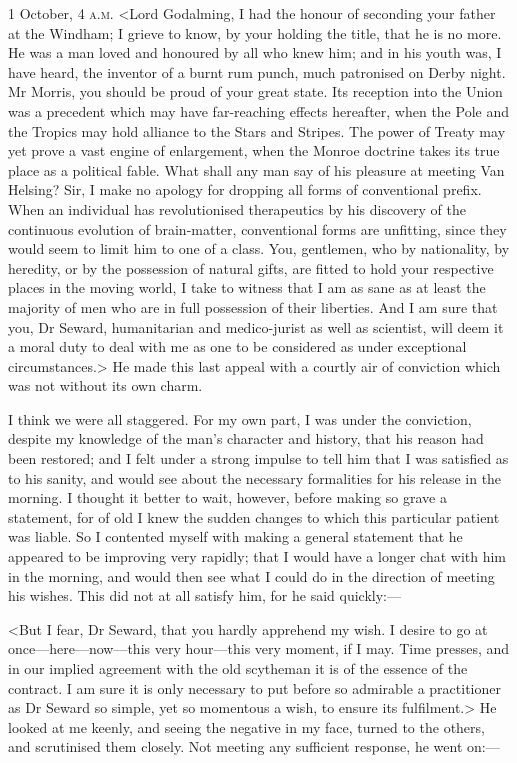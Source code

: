 \begin{diary}{1 October, 4 \textsc{a.m.}}
<Lord Godalming, I had the honour of seconding your father at the Windham; I grieve to know, by your holding the title, that he is no more. He was a man loved and honoured by all who knew him; and in his youth was, I have heard, the inventor of a burnt rum punch, much patronised on Derby night. Mr Morris, you should be proud of your great state. Its reception into the Union was a precedent which may have far-reaching effects hereafter, when the Pole and the Tropics may hold alliance to the Stars and Stripes. The power of Treaty may yet prove a vast engine of enlargement, when the Monroe doctrine takes its true place as a political fable. What shall any man say of his pleasure at meeting Van Helsing? Sir, I make no apology for dropping all forms of conventional prefix. When an individual has revolutionised therapeutics by his discovery of the continuous evolution of brain-matter, conventional forms are unfitting, since they would seem to limit him to one of a class. You, gentlemen, who by nationality, by heredity, or by the possession of natural gifts, are fitted to hold your respective places in the moving world, I take to witness that I am as sane as at least the majority of men who are in full possession of their liberties. And I am sure that you, Dr Seward, humanitarian and medico-jurist as well as scientist, will deem it a moral duty to deal with me as one to be considered as under exceptional circumstances.> He made this last appeal with a courtly air of conviction which was not without its own charm.

I think we were all staggered. For my own part, I was under the conviction, despite my knowledge of the man's character and history, that his reason had been restored; and I felt under a strong impulse to tell him that I was satisfied as to his sanity, and would see about the necessary formalities for his release in the morning. I thought it better to wait, however, before making so grave a statement, for of old I knew the sudden changes to which this particular patient was liable. So I contented myself with making a general statement that he appeared to be improving very rapidly; that I would have a longer chat with him in the morning, and would then see what I could do in the direction of meeting his wishes. This did not at all satisfy him, for he said quickly:—

<But I fear, Dr Seward, that you hardly apprehend my wish. I desire to go at once—here—now—this very hour—this very moment, if I may. Time presses, and in our implied agreement with the old scytheman it is of the essence of the contract. I am sure it is only necessary to put before so admirable a practitioner as Dr Seward so simple, yet so momentous a wish, to ensure its fulfilment.> He looked at me keenly, and seeing the negative in my face, turned to the others, and scrutinised them closely. Not meeting any sufficient response, he went on:—


\end{diary}
